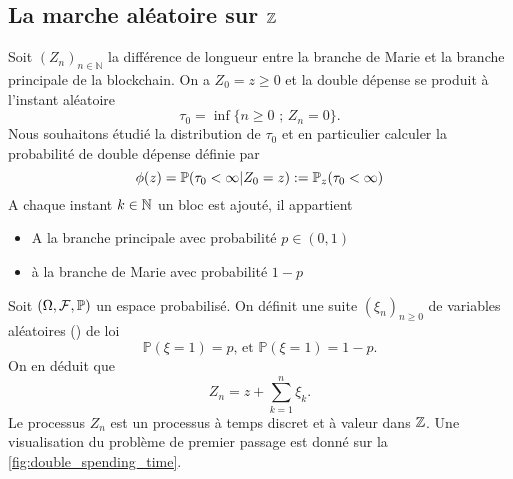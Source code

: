 \subsection{La marche aléatoire sur $\mathbb{Z}$}
Soit $(Z_n)_{n\in\mathbb{N}}$ la différence de longueur entre la branche de Marie et la branche principale de la blockchain. On a $Z_0 = z\geq 0$ et la double dépense se produit à l'instant aléatoire
\begin{equation}\label{eq:dp_time}
\tau_0 = \inf\{n\geq0\text{ ; }Z_n = 0\}.
\end{equation}
Nous souhaitons étudié la distribution de $\tau_0$ et en particulier calculer la probabilité de double dépense définie par 
\begin{equation}\label{eq:dp_prob}
\phi(z) = \mathbb{P}(\tau_0 <\infty|Z_0 = z) := \mathbb{P}_z(\tau_0 <\infty)
\end{equation}
A chaque instant $k\in\mathbb{N}$ un bloc est ajouté, il appartient 
\begin{itemize}
    \item A la branche principale avec probabilité $p\in(0,1)$
    \item à la branche de Marie avec probabilité $1-p$
\end{itemize}
Soit $(\Omega,\mathcal{F}, \mathbb{P})$ un espace probabilisé. On définit une suite $(\xi_n)_{n\geq0}$ \iid de variables aléatoires (\va) de loi 
$$
\mathbb{P}(\xi = 1) = p\text{, et }\mathbb{P}(\xi = 1) = 1-p.
$$
On en déduit que 
$$
Z_n = z +\sum_{k=1}^n\xi_k.
$$
Le processus $Z_n$ est un processus à temps discret et à valeur dans $\mathbb{Z}$. Une visualisation du problème de premier passage est donné sur la \cref{fig:double_spending_time}.
